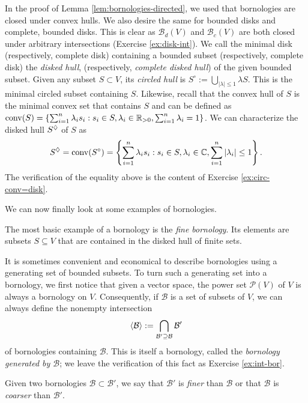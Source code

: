 
In the proof of Lemma \ref{lem:bornologies-directed}, we used that bornologies are closed under convex hulls. We also desire the same for bounded disks and complete, bounded disks. This is clear as \(\mathcal{B}_d(V)\) and \(\mathcal{B}_c(V)\) are both closed under arbitrary intersections (Exercise \ref{ex:disk-int}). We call the minimal disk (respectively, complete disk) containing a bounded subset (respectively, complete disk) the \emph{disked hull}, (respectively, \emph{complete disked hull}) 
of the given bounded subset.
Given any subset
$S \subset V$, its \emph{circled hull} is $S^{\circ} := \bigcup_{|\lambda| \le 1} \lambda S$. This is the minimal circled subset containing $S$. Likewise, 
recall that the convex hull of $S$ is 
the minimal convex set that contains $S$ and can be defined as $\operatorname{conv}(S) = \{\sum_{i=1}^n \lambda_i s_i : s_i \in S, \lambda_i \in \mathbb R_{>0}, \sum_{i=1}^n \lambda_i = 1\}$.
We can characterize 
the disked hull $S^\lozenge$ of $S$ as
\begin{equation}\label{eq:Sd=Scc}
    S^\lozenge = \operatorname{conv}(S^\circ) = \left\{\sum_{i=1}^n \lambda_i s_i : s_i \in S, \lambda_i \in \mathbb C, \sum_{i=1}^n |\lambda_i| \le 1\right\}.
\end{equation}
The verification of the equality above
is the content of Exercise \ref{ex:circ-conv=disk}.

We can now finally look at some examples of bornologies.

\begin{example}
    The most basic example of a bornology is the \emph{fine bornology}. Its elements are subsets \(S \subseteq V\) that are contained in the disked hull of finite sets.  
\end{example}

It is sometimes convenient and economical to describe bornologies using a generating set of bounded subsets. To turn such a generating set into a bornology, we first notice that given a vector space, the power set \(\mathcal{P}(V)\) of \(V\) is always a bornology on \(V\). Consequently, if \(\mathcal{B}\) is a set of subsets of \(V\), we can always define the nonempty intersection 
\[ \langle\mathcal{B}\rangle \mathrel{:=} \bigcap_{\mathcal{B}' \supseteq \mathcal{B}} \mathcal{B}'\] of 
bornologies containing \(\mathcal{B}\). This is itself a bornology, 
called the \emph{bornology generated by \(\mathcal{B}\)}; we leave the verification of this fact
as Exercise \ref{ex:int-bor}.

\begin{definition}\label{def:fine-coarse}
Given two bornologies $\mathcal B \subset \mathcal B'$, we say that $\mathcal B'$ is \emph{finer} than $\mathcal B$
or that  $\mathcal B$ is \emph{coarser} than $\mathcal B'$.
\end{definition}

